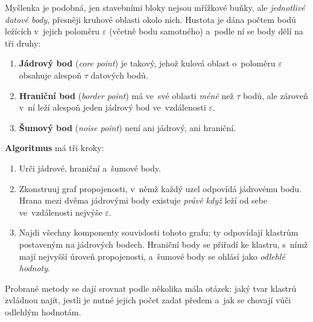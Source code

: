 \documentclass[11pt,a4paper]{article}
\theoremstyle{definition}
\begin{document}
\begin{defbox}
Myšlenka je podobná, jen stavebními bloky nejsou mřížkové buňky, ale \emph{jednotlivé datové
body}, přesněji kruhové oblasti okolo nich. Hustota je dána počtem bodů ležících v~jejich
poloměru $\varepsilon$ (včetně bodu samotného) a~podle ní se body dělí na tři druhy:
\begin{enumerate}
\item \textbf{Jádrový bod} (\emph{core point}) je takový, jehož kulová oblast o~poloměru
      $\varepsilon$ obsahuje alespoň $\tau$ datových bodů.
\item \textbf{Hraniční bod} (\emph{border point}) má ve~své oblasti \emph{méně} než $\tau$
      bodů, ale zároveň v~ní leží alespoň jeden jádrový bod ve~vzdálenosti $\varepsilon$.
\item \textbf{Šumový bod} (\emph{noise point}) není ani jádrový, ani hraniční.
\end{enumerate}

\textbf{Algoritmus} má tři kroky:
\begin{enumerate}
\item Urči jádrové, hraniční a~šumové body.
\item Zkonstruuj graf propojenosti, v~němž každý uzel odpovídá jádrovému bodu. Hrana mezi
      dvěma jádrovými body existuje \emph{právě když} leží od sebe ve~vzdálenosti nejvýše
      $\varepsilon$.
\item Najdi všechny komponenty souvislosti tohoto grafu; ty odpovídají klastrům postaveným na
      jádrových bodech. Hraniční body se přiřadí ke klastru, s~nímž mají nejvyšší úroveň
      propojenosti, a~šumové body se ohlásí jako \emph{odlehlé hodnoty}.
\end{enumerate}
\end{defbox}

Probrané metody se dají srovnat podle několika mála otázek: jaký tvar klastrů zvládnou najít,
jestli je nutné jejich počet zadat předem a~jak se chovají vůči odlehlým hodnotám.
\end{document}
